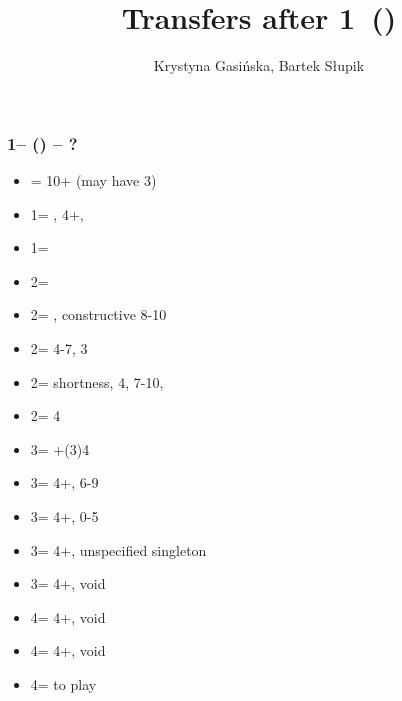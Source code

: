 \documentclass[12pt, a4paper]{article}
\title{Transfers after 1\majs\ (\dbl)}
\author{Krystyna Gasińska, Bartek Słupik}
\begin{document}
\maketitle


\subsubsection*{1\hearts -- (\dbl) -- ?}
\begin{itemize}
    \item \rdbl = 10+ (may have 3\hearts)
    \item 1\spades = \nat, 4+\spades, \fonce
    \item 1\nt = \trsf{2\clubs}
    \item 2\clubs = \trsf{2\diams}
    \item 2\diams = \trsf{2\hearts}, constructive 8-10
    \item 2\hearts = 4-7, 3\hearts
    \item 2\spades = \spades shortness, 4\hearts, 7-10, \inv \vimp
    \item 2\nt = 4\hearts \inv \vimp
    \item 3\clubs = \clubs+(3)4\hearts \inv \vimp
    \item 3\diams = 4+\hearts, 6-9
    \item 3\hearts = 4+\hearts, 0-5 \hcp
    \item 3\spades = 4+\hearts, unspecified singleton \vimp
    \item 3\nt = 4+\hearts, void \spades
    \item 4\clubs = 4+\hearts, void \clubs
    \item 4\diams = 4+\hearts, void \diams
    \item 4\hearts = to play
\end{itemize}
\end{document}
